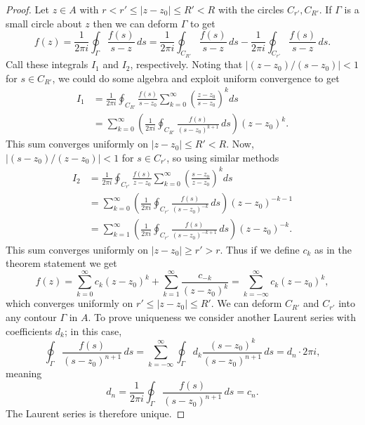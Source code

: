 \documentclass[../m136main.tex]{subfiles}
\begin{document}
\begin{proof}
    Let $z \in A$ with $r < r' \leq |z - z_0| \leq R' < R$ with the circles $C_{r'}, C_{R'}$.
    If $\Gamma$ is a small circle about $z$ then we can deform $\Gamma$ to get
    \[ f(z) = \frac{1}{2\pi i} \oint_\Gamma \frac{f(s)}{s-z} \,ds = \frac{1}{2\pi i} \oint_{C_{R'}} \frac{f(s)}{s-z} \,ds - \frac{1}{2\pi i} \oint_{C_{r'}} \frac{f(s)}{s-z} \,ds. \]
    Call these integrals $I_1$ and $I_2$, respectively.
    Noting that $|(z - z_0) / (s - z_0)| < 1$ for $s \in C_{R'}$, we could do some algebra and exploit uniform convergence to get
    \begin{align*}
        I_1 &= \frac{1}{2\pi i} \oint_{C_{R'}} \frac{f(s)}{s - z_0} \sum_{k=0}^{\infty} \left( \frac{z - z_0}{s - z_0} \right)^{k} ds \\
        &= \sum_{k=0}^{\infty} \left( \frac{1}{2\pi i} \oint_{C_{R'}} \frac{f(s)}{(s - z_0)^{k+1}} \,ds \right) (z - z_0)^{k}.
    \end{align*}
    This sum converges uniformly on $|z - z_0| \leq R' < R$.
    Now, $|(s - z_0) / (z - z_0)| < 1$ for $s \in C_{r'}$, so using similar methods     \vspace{-12pt}
    \begin{align*}
        I_2 &= \frac{1}{2\pi i} \oint_{C_{r'}} \frac{f(s)}{z - z_0} \sum_{k=0}^{\infty} \left( \frac{s - z_0}{z - z_0} \right)^{k} ds \\
        &= \sum_{k=0}^{\infty} \left( \frac{1}{2\pi i} \oint_{C_{r'}} \frac{f(s)}{(s - z_0)^{-k}} \,ds \right) (z - z_0)^{-k-1} \\
        &= \sum_{k=1}^{\infty} \left( \frac{1}{2\pi i} \oint_{C_{r'}} \frac{f(s)}{(s - z_0)^{-k+1}} \,ds \right) (z - z_0)^{-k}.
    \end{align*}
    This sum converges uniformly on $|z - z_0| \geq r' > r$.
    Thus if we define $c_k$ as in the theorem statement we get
    \[ f(z) = \sum_{k=0}^{\infty} c_k (z - z_0)^{k} + \sum_{k=1}^{\infty} \frac{c_{-k}}{(z - z_0)^{k}} = \sum_{k=-\infty}^{\infty} c_k (z - z_0)^{k}, \]
    which converges uniformly on $r' \leq |z - z_0| \leq R'$.
    We can deform $C_{R'}$ and $C_{r'}$ into any contour $\Gamma$ in $A$.
    To prove uniqueness we consider another Laurent series with coefficients $d_k$; in this case,
    \[ \oint_\Gamma \frac{f(s)}{(s - z_0)^{n+1}} \,ds = \sum_{k=-\infty}^{\infty} \oint_\Gamma d_k \frac{(s - z_0)^{k}}{(s - z_0)^{n+1}} \,ds = d_n \cdot 2\pi i, \]
    meaning
    \[ d_n = \frac{1}{2\pi i} \oint_\Gamma \frac{f(s)}{(s - z_0)^{n+1}} \,ds = c_n. \]
    The Laurent series is therefore unique.
\end{proof}
\end{document}
